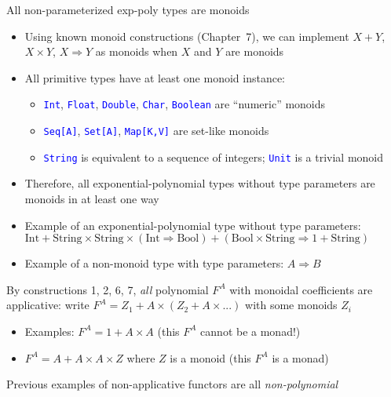\documentclass[english]{beamer}
\begin{document}
\begin{frame}{All non-parameterized exp-poly types are monoids}
\begin{itemize}
\item \vspace{-0.1cm}Using known monoid constructions (Chapter\ 7), we
can implement $X+Y$, $X\times Y$, $X\Rightarrow Y$ as monoids when
$X$ and $Y$ are monoids
\item All primitive types have at least one monoid instance:
\begin{itemize}
\item \texttt{\textcolor{blue}{\footnotesize{}Int}}, \texttt{\textcolor{blue}{\footnotesize{}Float}},
\texttt{\textcolor{blue}{\footnotesize{}Double}}, \texttt{\textcolor{blue}{\footnotesize{}Char}},
\texttt{\textcolor{blue}{\footnotesize{}Boolean}} are ``numeric''
monoids
\item \texttt{\textcolor{blue}{\footnotesize{}Seq{[}A{]}}}, \texttt{\textcolor{blue}{\footnotesize{}Set{[}A{]}}},
\texttt{\textcolor{blue}{\footnotesize{}Map{[}K,V{]}}} are set-like
monoids
\item \texttt{\textcolor{blue}{\footnotesize{}String}} is equivalent to
a sequence of integers; \texttt{\textcolor{blue}{\footnotesize{}Unit}}
is a trivial monoid
\end{itemize}
\item Therefore, all exponential-polynomial types without type parameters
are monoids in at least one way
\item Example of an exponential-polynomial type without type parameters:
{\footnotesize{}$\text{Int}+\text{String}\times\text{String}\times\left(\text{Int}\Rightarrow\text{Bool}\right)+\left(\text{Bool}\times\text{String}\Rightarrow1+\text{String}\right)$} 
\item Example of a non-monoid type with type parameters: $A\Rightarrow B$
\end{itemize}
By constructions 1, 2, 6, 7, \emph{all} polynomial $F^{A}$ with monoidal
coefficients are applicative: write $F^{A}=Z_{1}+A\times\left(Z_{2}+A\times...\right)$
with some monoids $Z_{i}$
\begin{itemize}
\item Examples: $F^{A}=1+A\times A$ (this $F^{A}$ cannot be a monad!)
\item $F^{A}=A+A\times A\times Z$ where $Z$ is a monoid (this $F^{A}$
is a monad)
\end{itemize}
Previous examples of non-applicative functors are all \emph{non-polynomial}
\end{frame}
\end{document}
